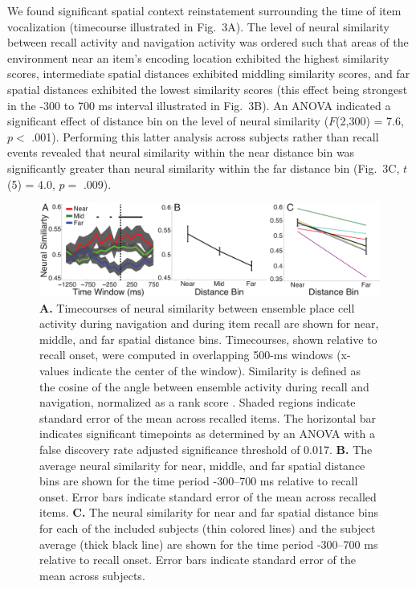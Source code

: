 We found significant spatial context reinstatement surrounding the time of item vocalization (timecourse illustrated in Fig.~3A). The level of neural similarity between recall activity and navigation activity was ordered such that areas of the environment near  an item's encoding location exhibited the highest similarity scores, intermediate spatial distances exhibited middling similarity scores, and far spatial distances exhibited the lowest similarity scores (this effect being strongest in the -300 to 700 ms interval illustrated in Fig.~3B).  An ANOVA indicated a significant effect of distance bin on the level of neural similarity ($F$(2,300) = 7.6, $p <$ .001). Performing this latter analysis across subjects rather than recall events revealed that neural similarity within the near distance bin was significantly greater than neural similarity within the far distance bin (Fig.~3C, $t$(5) = 4.0, $p =$ .009).   

\begin{figure}
\centering
  \includegraphics[width=1\textwidth]{./tex/dboy/figs/fig3}
  \caption[Timecourse of neural similarity]{\textbf{A.} Timecourses of neural similarity between ensemble place cell activity during navigation and during item recall are shown for near, middle, and far spatial distance bins.  Timecourses, shown relative to recall onset, were  computed in overlapping 500-ms windows (x-values indicate the center of the window).  Similarity is defined as the cosine of the angle between ensemble activity during recall and navigation, normalized as a rank score \cite{suppnote}. Shaded regions indicate standard error of the mean across recalled items. The horizontal bar indicates significant timepoints as determined by an ANOVA with a false discovery rate adjusted significance threshold of 0.017.  \textbf{B.} The average neural similarity for near, middle, and far spatial distance bins are shown for the time period -300--700 ms relative to recall onset. Error bars indicate standard error of the mean across recalled items.  \textbf{C.} The neural similarity for near and far spatial distance bins for each of the included subjects (thin colored lines) and the subject average (thick black line) are shown for the  time period -300--700 ms relative to recall onset. Error bars indicate standard error of the mean across subjects.}
\label{fig:reinstate}
\end{figure}

